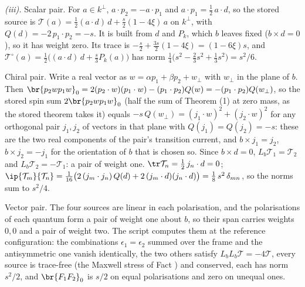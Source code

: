 \emph{(iii).} Scalar pair. For $a \in k^{\perp}$, $a \cdot p_{2} = -a \cdot p_{1}$ and $a \cdot p_{1} = \tfrac12\,a \cdot d$, so the stored source is $\mathcal{T}(a) = \tfrac12 (a \cdot d)\,d + \tfrac{s}{2}(1 - 4\xi)\,a$ on $k^{\perp}$, with $Q(d) = -2\,p_{1} \cdot p_{2} = -s$. It is built from $d$ and $P_{k}$, which $b$ leaves fixed ($b \times d = 0$), so it has weight zero. Its trace is $-\tfrac{s}{2} + \tfrac{3s}{2}(1 - 4\xi) = (1 - 6\xi)s$, and $\mathcal{T}^{\circ}(a) = \tfrac12\bigl((a \cdot d)\,d + \tfrac{s}{3}P_{k}(a)\bigr)$ has norm $\tfrac14\bigl(s^{2} - \tfrac23 s^{2} + \tfrac13 s^{2}\bigr) = s^{2}/6$.

Chiral pair. Write a real vector as $w = \alpha p_{1} + \beta p_{2} + w_{\perp}$ with $w_{\perp}$ in the plane of $b$. Then $\br{p_{2}wp_{1}w}_{0} = 2(p_{2} \cdot w)(p_{1} \cdot w) - (p_{1} \cdot p_{2})Q(w) = -(p_{1} \cdot p_{2})Q(w_{\perp})$, so the stored spin sum $2\br{p_{2}wp_{1}w}_{0}$ (half the sum of Theorem (1) at zero mass, as the stored theorem takes it) equals $-s\,Q(w_{\perp}) = (j_{1} \cdot w)^{2} + (j_{2} \cdot w)^{2}$ for any orthogonal pair $j_{1}, j_{2}$ of vectors in that plane with $Q(j_{1}) = Q(j_{2}) = -s$: these are the two real components of the pair's transition current, and $b \times j_{1} = j_{2}$, $b \times j_{2} = -j_{1}$ for the orientation of $b$ that is chosen so. Since $b \times d = 0$, $L_{b}\mathcal{T}_{1} = \mathcal{T}_{2}$ and $L_{b}\mathcal{T}_{2} = -\mathcal{T}_{1}$: a pair of weight one. $\tr\mathcal{T}_{n} = \tfrac12\,j_{n} \cdot d = 0$; $\ip{\mathcal{T}_{m}}{\mathcal{T}_{n}} = \tfrac{1}{16}\bigl(2\,(j_{m} \cdot j_{n})\,Q(d) + 2\,(j_{m} \cdot d)(j_{n} \cdot d)\bigr) = \tfrac18\,s^{2}\,\delta_{mn}$, so the norms sum to $s^{2}/4$.

Vector pair. The four sources are linear in each polarisation, and the polarisations of each quantum form a pair of weight one about $b$, so their span carries weights $0, 0$ and a pair of weight two. The script computes them at the reference configuration: the combinations $\epsilon_{1} = \epsilon_{2}$ summed over the frame and the antisymmetric one vanish identically, the two others satisfy $L_{b}L_{b}\mathcal{T} = -4\mathcal{T}$, every source is trace-free (the Maxwell stress of Fact ) and conserved, each has norm $s^{2}/2$, and $\br{F_{1}F_{2}}_{0}$ is $s/2$ on equal polarisations and zero on unequal ones.

